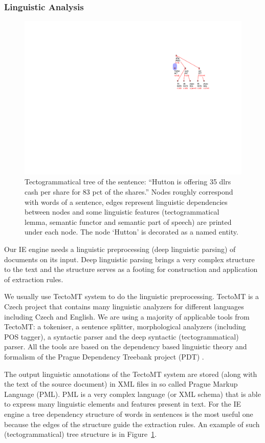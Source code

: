 \subsubsection{Linguistic Analysis}


\begin{figure}
\centerline{\includegraphics[angle=90, width=0.4\hsize]{tree}}
\caption{Tectogrammatical tree of the sentence: ``Hutton is offering 35 dlrs cash per share for 83 pct of the shares.''
Nodes roughly correspond with words of a sentence, edges represent linguistic dependencies between nodes and some linguistic features (tectogrammatical lemma, semantic functor and semantic part of speech) are printed under each node. The node `Hutton' is decorated as a named entity.}
\label{img:tree}
\end{figure}


Our IE engine needs a linguistic preprocessing (deep linguistic parsing) of documents on its input. Deep linguistic parsing brings a very complex structure to the text and the structure serves as a footing for construction and application of extraction rules. 

We usually use TectoMT system \citep{biblio:ZaPtTectoMTHighly2008} to do the linguistic preprocessing. TectoMT is a Czech project that contains many linguistic analyzers for different languages including Czech and English. We are using a majority of applicable tools from TectoMT: a tokeniser, a sentence splitter, morphological analyzers (including POS tagger), a syntactic parser and the deep syntactic (tectogrammatical) parser. All the tools are based on the dependency based linguistic theory and formalism of the Prague Dependency Treebank project (PDT) \citep{biblio:PDT20_CD}.

The output linguistic annotations of the TectoMT system are stored (along with the text of the source document) in XML files in so called Prague Markup Language (PML). PML is a very complex language (or XML schema) that is able to express many linguistic elements and features present in text. For the IE engine a tree dependency structure of words in sentences is the most useful one because the edges of the structure guide the extraction rules. An example of such (tectogrammatical) tree structure is in Figure~\ref{img:tree}.


